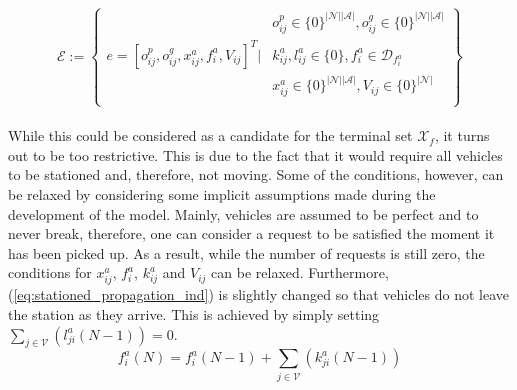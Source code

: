 \begin{equation}
	\mathcal{E} := \left\{
	\begin{aligned}
		& o^p_{ij} \in \{0\}^{|\mathcal{N}||\mathcal{A}|} , o^g_{ij} \in \{0\}^{|\mathcal{N}||\mathcal{A}|} \\
		e = [o^p_{ij},o^g_{ij}, x_{ij}^a, f^a_{i}, V_{ij}]^T \Bigg| &k^a_{ij}, l^a_{ij}\in \{0\}, f^a_{i} \in \mathcal{D}_{f^a_{i}}  \\
		& x_{ij}^a\in\{0\}^{|\mathcal{N}||\mathcal{A}|}, V_{ij} \in \{0\}^{|\mathcal{N}|} \\%
	\end{aligned}
	\right\}\label{eq:final_eq}
\end{equation}\\
While this could be considered as a candidate for the terminal set $\mathcal{X}_f$, it turns out to be too restrictive. This is due to the fact that it would require all vehicles to be stationed and, therefore, not moving. Some of the conditions, however, can be relaxed by considering some implicit assumptions made during the development of the model. Mainly, vehicles are assumed to be perfect and to never break, therefore, one can consider a request to be satisfied the moment it has been picked up. As a result, while the number of requests is still zero, the conditions for $x_{ij}^a$, $f_{i}^a$, $k^a_{ij}$ and $V_{ij}$ can be relaxed. Furthermore, (\ref{eq:stationed_propagation_ind}) is slightly changed so that vehicles do not leave the station as they arrive. This is achieved by simply setting $\sum_{j\in\mathcal{V}}(l^a_{ji}(N-1))=0$.
\begin{equation}
	f^a_i(N) =f^a_i(N-1) + \sum_{j\in\mathcal{V}}(k^a_{ji}(N-1)) 
	\label{eq:stationed_propagation_ind2}
\end{equation}



